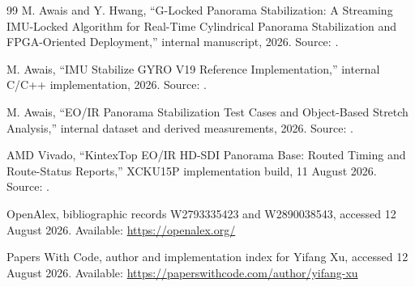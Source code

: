 \documentclass[10pt]{article}
\begin{document}
\begin{thebibliography}{99}
M. Awais and Y. Hwang, ``G-Locked Panorama Stabilization: A Streaming IMU-Locked Algorithm for Real-Time Cylindrical Panorama Stabilization and FPGA-Oriented Deployment,'' internal manuscript, 2026. Source: .

M. Awais, ``IMU Stabilize GYRO V19 Reference Implementation,'' internal C/C++ implementation, 2026. Source: .

M. Awais, ``EO/IR Panorama Stabilization Test Cases and Object-Based Stretch Analysis,'' internal dataset and derived measurements, 2026. Source: .

AMD Vivado, ``KintexTop EO/IR HD-SDI Panorama Base: Routed Timing and Route-Status Reports,'' XCKU15P implementation build, 11 August 2026. Source: .

OpenAlex, bibliographic records W2793335423 and W2890038543, accessed 12 August 2026. Available: \url{https://openalex.org/}

Papers With Code, author and implementation index for Yifang Xu, accessed 12 August 2026. Available: \url{https://paperswithcode.com/author/yifang-xu}

\end{thebibliography}
\end{document}
